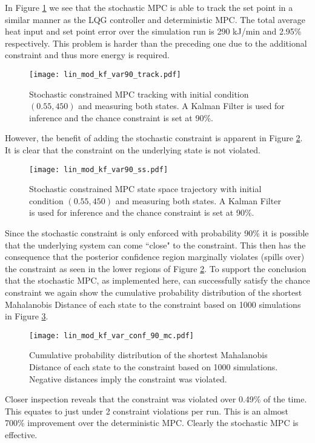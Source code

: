 In Figure \ref{fig_lin_mod_kf_var90_track} we see that the stochastic MPC is able to track the set point in a similar manner as the LQG controller and deterministic MPC. The total average heat input and set point error over the simulation run is 290 kJ/min and 2.95\% respectively. This problem is harder than the preceding one due to the additional constraint and thus more energy is required. 
\begin{figure}[H] 
\centering
\texttt{[image: lin\_mod\_kf\_var90\_track.pdf]}
\caption{Stochastic constrained MPC tracking with initial condition $(0.55, 450)$ and measuring both states. A Kalman Filter is used for inference and the chance constraint is set at 90\%.}
\label{fig_lin_mod_kf_var90_track}
\end{figure}
However, the benefit of adding the stochastic constraint is apparent in Figure \ref{fig_lin_mod_kf_var90_ss}. It is clear that the constraint on the underlying state is not violated.
\begin{figure}[H] 
\centering
\texttt{[image: lin\_mod\_kf\_var90\_ss.pdf]}
\caption{Stochastic constrained MPC state space trajectory with initial condition $(0.55, 450)$ and measuring both states. A Kalman Filter is used for inference and the chance constraint is set at 90\%.}
\label{fig_lin_mod_kf_var90_ss}
\end{figure}
Since the stochastic constraint is only enforced with probability 90\% it is possible that the underlying system can come ``close" to the constraint. This then has the consequence that the posterior confidence region marginally violates (spills over) the constraint as seen in the lower regions of Figure \ref{fig_lin_mod_kf_var90_ss}. To support the conclusion that the stochastic MPC, as implemented here, can successfully satisfy the chance constraint we again show the cumulative probability distribution of the shortest Mahalanobis Distance of each state to the constraint based on 1000 simulations in Figure \ref{fig_lin_mod_kf_var_conf_90_mc}.
\begin{figure}[H]
\centering
\texttt{[image: lin\_mod\_kf\_var\_conf\_90\_mc.pdf]}
\caption{Cumulative probability distribution of the shortest Mahalanobis Distance of each state to the constraint based on 1000 simulations. Negative distances imply the constraint was violated.}
\label{fig_lin_mod_kf_var_conf_90_mc}
\end{figure}
Closer inspection reveals that the constraint was violated over 0.49\% of the time. This equates to just under 2 constraint violations per run. This is an almost 700\% improvement over the deterministic MPC. Clearly the stochastic MPC is effective.

